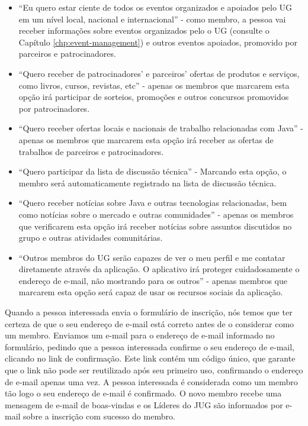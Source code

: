 \documentclass[envcountsame,envcountchap]{svmono}
\begin{document}
\begin{itemize}
\item ``Eu quero estar ciente de todos os eventos organizados e apoiados pelo UG em um nível local, nacional e internacional'' - como membro, a pessoa vai receber informações sobre eventos organizados pelo o UG (consulte o Capítulo \ref{chp:event-management}) e outros eventos apoiados, promovido por parceiros e patrocinadores.

\item ``Quero receber de patrocinadores' e parceiros' ofertas de produtos e serviços, como livros, cursos, revistas, etc'' - apenas os membros que marcarem esta opção irá participar de sorteios, promoções e outros concursos promovidos por patrocinadores.

\item ``Quero receber ofertas locais e nacionais de trabalho relacionadas com Java'' - apenas os membros que marcarem esta opção irá receber as ofertas de trabalhos de parceiros e patrocinadores.

\item ``Quero participar da lista de discussão técnica'' - Marcando esta opção, o membro será automaticamente registrado na lista de discussão técnica.

\item ``Quero receber notícias sobre Java e outras tecnologias relacionadas, bem como notícias sobre o mercado e outras comunidades'' - apenas os membros que verificarem esta opção irá receber notícias sobre assuntos discutidos no grupo e outras atividades comunitárias.

\item ``Outros membros do UG serão capazes de ver o meu perfil e me contatar diretamente através da aplicação. O aplicativo irá proteger cuidadosamente o endereço de e-mail, não mostrando para os outros'' - apenas membros que marcarem esta opção será capaz de usar os recursos sociais da aplicação.
\end{itemize}

Quando a pessoa interessada envia o formulário de inscrição, nós temos que ter certeza de que o seu endereço de e-mail está correto antes de o considerar como um membro. Enviamos um e-mail para o endereço de e-mail informado no formulário, pedindo que a pessoa interessada confirme o seu endereço de e-mail, clicando no link de confirmação. Este link contém um código único, que garante que o link não pode ser reutilizado após seu primeiro uso, confirmando o endereço de e-mail apenas uma vez. A pessoa interessada é considerada como um membro tão logo o seu endereço de e-mail é confirmado. O novo membro recebe uma mensagem de e-mail de boas-vindas e os Líderes do JUG são informados por e-mail sobre a inscrição com sucesso do membro.
\end{document}
